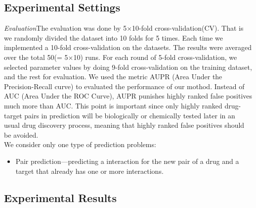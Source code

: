 \documentclass{article}
\begin{document}
\subsection{Experimental Settings}
\textit{Evaluation}\quad The evaluation was done by 5$\times$10-fold cross-validation(CV). That is we randomly divided the dataset into 10 folds for 5 times. Each time we implemented a 10-fold cross-validation on the datasets. The results were averaged over the total 50(= 5$\times$10) runs. For each round of 5-fold cross-validation, we selected
parameter values by doing 9-fold cross-validation on the training dataset, and the rest for evaluation.  We used the metric AUPR (Area Under the Precision-Recall curve) to evaluated the performance of our mothod. Instead of AUC (Area Under the ROC Curve), AUPR punishes highly ranked false positives much more than AUC. This point is important since only
highly ranked drug-target pairs in prediction will be biologically or chemically tested later in an usual drug discovery process, meaning that highly ranked false positives should be avoided. \cite{zheng2013collaborative} \\ 
\indent We consider only one type of prediction problems:\cite{ding2013similarity}
\begin{itemize}
\item Pair prediction---predicting a interaction for the new pair of a drug and a target that already has one or more interactions.
\end{itemize}

\subsection{Experimental Results}
\end{document}
